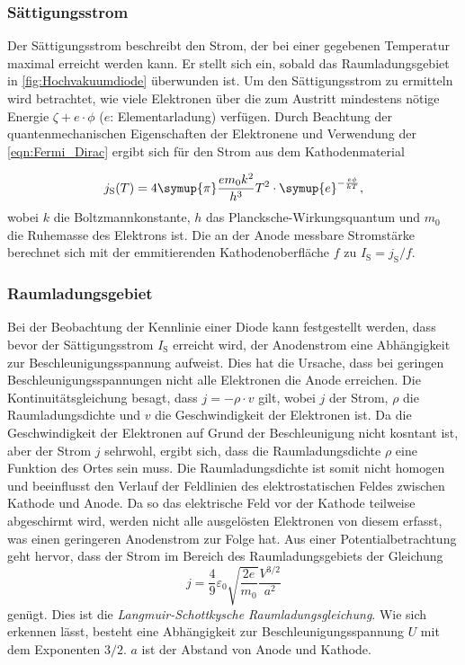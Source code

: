 \subsubsection{Sättigungsstrom}
Der Sättigungsstrom beschreibt den Strom, der bei einer gegebenen Temperatur maximal erreicht werden kann. Er stellt sich ein, sobald das Raumladungsgebiet in \ref{fig:Hochvakuumdiode}
überwunden ist. Um den Sättigungsstrom zu ermitteln wird betrachtet, wie viele Elektronen über die zum Austritt mindestens nötige Energie 
$\zeta + e \cdot \phi$ ($e$: Elementarladung) verfügen. Durch Beachtung der quantenmechanischen Eigenschaften der Elektronene und Verwendung der \autoref{eqn:Fermi_Dirac} ergibt sich
für den Strom aus dem Kathodenmaterial

\begin{equation}
    \label{eqn:J_S}
    j_\text{S}(T) = 4 \symup{\pi}\frac{e m_0 k^2}{h^3}T^2 \cdot \symup{e}^{-\frac{e\phi}{kT}},
\end{equation}
wobei $k$ die Boltzmannkonstante, $h$ das Plancksche-Wirkungsquantum und $m_0$ die Ruhemasse des Elektrons ist. Die an der Anode messbare Stromstärke berechnet sich mit der 
emmitierenden Kathodenoberfläche $f$ zu $I_\text{S} = j_\text{S}/f$.

\subsubsection{Raumladungsgebiet}
Bei der Beobachtung der Kennlinie einer Diode kann festgestellt werden, dass bevor der Sättigungsstrom $I_\text{S}$ erreicht wird, der Anodenstrom eine Abhängigkeit zur 
Beschleunigungsspannung aufweist. Dies hat die Ursache, dass bei geringen Beschleunigungsspannungen nicht alle Elektronen die Anode erreichen. Die Kontinuitätsgleichung
besagt, dass $j = -\rho \cdot v$ gilt, wobei $j$ der Strom, $\rho$ die Raumladungsdichte und $v$ die Geschwindigkeit der Elektronen ist. Da die Geschwindigkeit der Elektronen auf Grund
der Beschleunigung nicht kosntant ist, aber der Strom $j$ sehrwohl, ergibt sich, dass die Raumladungsdichte $\rho$ eine Funktion des Ortes sein muss.
Die Raumladungsdichte ist somit nicht homogen und beeinflusst den Verlauf der Feldlinien des elektrostatischen Feldes zwischen Kathode und Anode. 
Da so das elektrische Feld vor der Kathode teilweise abgeschirmt wird, werden nicht alle ausgelösten Elektronen von diesem erfasst, was einen geringeren Anodenstrom zur Folge hat.
Aus einer Potentialbetrachtung geht hervor, dass der Strom im Bereich des Raumladungsgebiets der Gleichung
\begin{equation}
    \label{eqn:Raumladung}
    j = \frac{4}{9}\varepsilon_0 \sqrt{\frac{2e}{m_0}}\frac{V^{3/2}}{a^2}
\end{equation}
genügt. Dies ist die \textit{Langmuir-Schottkysche Raumladungsgleichung}. 
Wie sich erkennen lässt, besteht eine Abhängigkeit zur Beschleunigungsspannung $U$ mit dem Exponenten $3/2$. $a$ ist der Abstand von Anode und Kathode.

